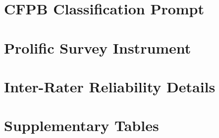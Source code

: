 \documentclass[letterpaper]{article}
\begin{document}
\clearpage


\clearpage
\appendix
\renewcommand{\thetable}{\thesection.\arabic{table}}
\renewcommand{\thefigure}{\thesection.\arabic{figure}}

\section{CFPB Classification Prompt}
\label{app:cfpb_prompt}


\section{Prolific Survey Instrument}
\label{app:prolific_instrument}


\section{Inter-Rater Reliability Details}
\label{app:interrater}


\section{Supplementary Tables}
\label{app:supplementary}

\end{document}
